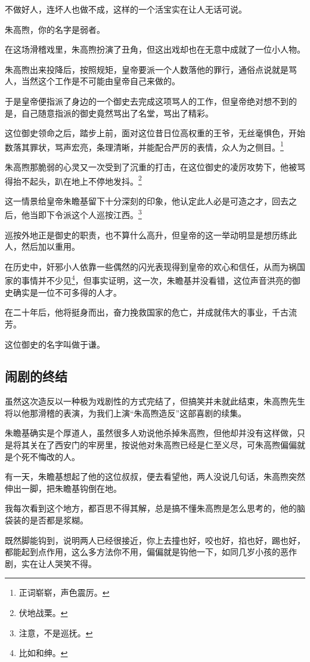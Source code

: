 \begin{multicols}{\theparacolNo}
不做好人，连坏人也做不成，这样的一个活宝实在让人无话可说。

朱高煦，你的名字是弱者。

在这场滑稽戏里，朱高煦扮演了丑角，但这出戏却也在无意中成就了一位小人物。

朱高煦出来投降后，按照规矩，皇帝要派一个人数落他的罪行，通俗点说就是骂人，当然这个工作是不可能由皇帝自己来做的。

于是皇帝便指派了身边的一个御史去完成这项骂人的工作，但皇帝绝对想不到的是，自己随意指派的御史竟然骂出了名堂，骂出了精彩。

这位御史领命之后，踏步上前，面对这位昔日位高权重的王爷，无丝毫惧色，开始数落其罪状，骂声宏亮，条理清晰，并能配合严厉的表情，众人为之侧目。\footnote{正词崭崭，声色震厉。}

朱高煦那脆弱的心灵又一次受到了沉重的打击，在这位御史的凌厉攻势下，他被骂得抬不起头，趴在地上不停地发抖。\footnote{伏地战栗。}

这一情景给皇帝朱瞻基留下十分深刻的印象，他认定此人必是可造之才，回去之后，他当即下令派这个人巡按江西。\footnote{注意，不是巡抚。}

巡按外地正是御史的职责，也不算什么高升，但皇帝的这一举动明显是想历练此人，然后加以重用。

在历史中，奸邪小人依靠一些偶然的闪光表现得到皇帝的欢心和信任，从而为祸国家的事情并不少见\footnote{比如和绅。}，但事实证明，这一次，朱瞻基并没看错，这位声音洪亮的御史确实是一位不可多得的人才。

在二十年后，他将挺身而出，奋力挽救国家的危亡，并成就伟大的事业，千古流芳。

这位御史的名字叫做于谦。

\subsection{闹剧的终结}
虽然这次造反以一种极为戏剧性的方式完结了，但搞笑并未就此结束，朱高煦先生将以他那滑稽的表演，为我们上演“朱高煦造反”这部喜剧的续集。

朱瞻基确实是个厚道人，虽然很多人劝说他杀掉朱高煦，但他却并没有这样做，只是将其关在了西安门的牢房里，按说他对朱高煦已经是仁至义尽，可朱高煦偏偏就是个死不悔改的人。

有一天，朱瞻基想起了他的这位叔叔，便去看望他，两人没说几句话，朱高煦突然伸出一脚，把朱瞻基钩倒在地。

我每次看到这个地方，都百思不得其解，总是搞不懂朱高煦是怎么思考的，他的脑袋装的是否都是浆糊。

既然脚能钩到，说明两人已经很接近，你上去撞也好，咬也好，掐也好，踢也好，都能起到点作用，这么多方法你不用，偏偏就是钩他一下，如同几岁小孩的恶作剧，实在让人哭笑不得。


\end{multicols}
